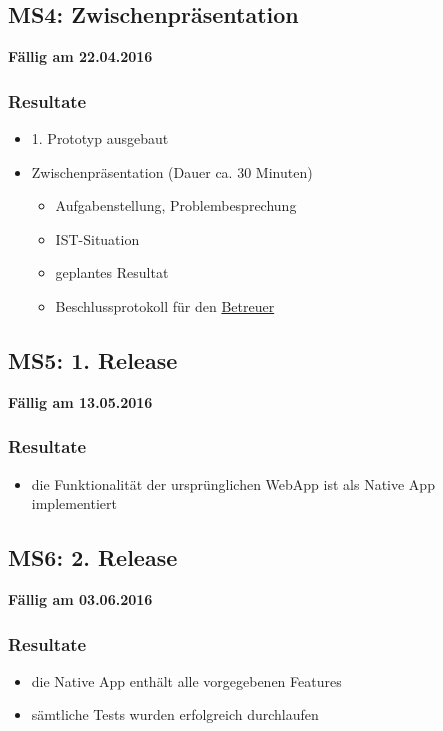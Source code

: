 \subsection{MS4: Zwischenpräsentation}
\label{pm-ms4}
\textbf{Fällig am 22.04.2016}
\subsubsection{Resultate}
\begin{itemize}
	\item 1. Prototyp ausgebaut
	\item Zwischenpräsentation (Dauer ca. 30 Minuten)
	\begin{itemize}
		\item Aufgabenstellung, Problembesprechung
		\item IST-Situation
		\item geplantes Resultat
		\item Beschlussprotokoll für den \hyperref[pm-rollen]{Betreuer}
	\end{itemize}
\end{itemize}

\subsection{MS5: 1. Release}
\label{pm-ms5}
\textbf{Fällig am 13.05.2016}
\subsubsection{Resultate}
\begin{itemize}
	\item die Funktionalität der ursprünglichen \kort{} \gls{WebApp} ist als Native App implementiert
\end{itemize}

\subsection{MS6: 2. Release}
\label{pm-ms6}
\textbf{Fällig am 03.06.2016}
\subsubsection{Resultate}
\begin{itemize}
	\item die Native App enthält alle vorgegebenen Features
	\item sämtliche Tests wurden erfolgreich durchlaufen
\end{itemize}

